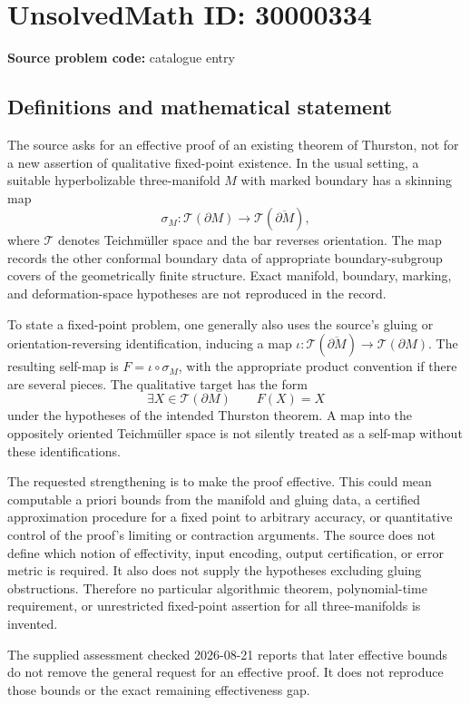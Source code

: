 \documentclass[11pt]{article}
\begin{document}
\section*{UnsolvedMath ID: 30000334}
\textbf{Source problem code:} catalogue entry
\subsection{Definitions and mathematical statement}
The source asks for an effective proof of an existing theorem of Thurston, not for a new assertion of qualitative fixed-point existence. In the usual setting, a suitable hyperbolizable three-manifold \(M\) with marked boundary has a skinning map
\[
\sigma_M:\mathcal T(\partial M)\longrightarrow\mathcal T(\overline{\partial M}),
\]
where \(\mathcal T\) denotes Teichm\"uller space and the bar reverses orientation. The map records the other conformal boundary data of appropriate boundary-subgroup covers of the geometrically finite structure. Exact manifold, boundary, marking, and deformation-space hypotheses are not reproduced in the record.

To state a fixed-point problem, one generally also uses the source's gluing or orientation-reversing identification, inducing a map \(\iota:\mathcal T(\overline{\partial M})\to\mathcal T(\partial M)\). The resulting self-map is \(F=\iota\circ\sigma_M\), with the appropriate product convention if there are several pieces. The qualitative target has the form
\[
\exists X\in\mathcal T(\partial M)\qquad F(X)=X
\]
under the hypotheses of the intended Thurston theorem. A map into the oppositely oriented Teichm\"uller space is not silently treated as a self-map without these identifications.

The requested strengthening is to make the proof effective. This could mean computable a priori bounds from the manifold and gluing data, a certified approximation procedure for a fixed point to arbitrary accuracy, or quantitative control of the proof's limiting or contraction arguments. The source does not define which notion of effectivity, input encoding, output certification, or error metric is required. It also does not supply the hypotheses excluding gluing obstructions. Therefore no particular algorithmic theorem, polynomial-time requirement, or unrestricted fixed-point assertion for all three-manifolds is invented.

The supplied assessment checked 2026-08-21 reports that later effective bounds do not remove the general request for an effective proof. It does not reproduce those bounds or the exact remaining effectiveness gap.
\end{document}
